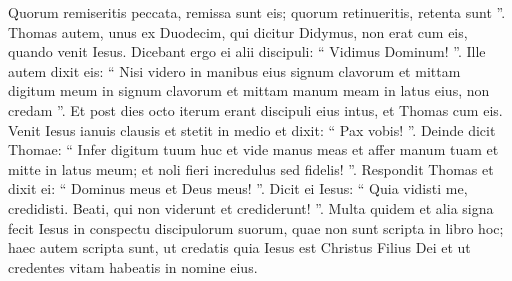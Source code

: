 \begin{biblechapter}
\begin{biblechapter}
\begin{biblechapter}
\begin{biblechapter}
\begin{biblechapter}
\begin{biblechapter}
\begin{biblechapter}
\begin{biblechapter}
\begin{biblechapter}
\begin{biblechapter}
\begin{biblechapter}
\begin{biblechapter}
\begin{biblechapter}
\begin{biblechapter}
\begin{biblechapter}
\begin{biblechapter}
\begin{biblechapter}
\begin{biblechapter}
\begin{biblechapter}
\begin{biblechapter}
\verse Quorum remiseritis peccata, remissa sunt eis; quorum retinueritis, retenta sunt ”.
 \verse Thomas autem, unus ex Duodecim, qui dicitur Didymus, non erat cum eis, quando venit Iesus. 
\verse Dicebant ergo ei alii discipuli: “ Vidimus Dominum! ”. Ille autem dixit eis: “ Nisi videro in manibus eius signum clavorum et mittam digitum meum in signum clavorum et mittam manum meam in latus eius, non credam ”.
 \verse Et post dies octo iterum erant discipuli eius intus, et Thomas cum eis. Venit Iesus ianuis clausis et stetit in medio et dixit: “ Pax vobis! ”. 
\verse Deinde dicit Thomae: “ Infer digitum tuum huc et vide manus meas et affer manum tuam et mitte in latus meum; et noli fieri incredulus sed fidelis! ”. 
\verse Respondit Thomas et dixit ei: “ Dominus meus et Deus meus! ”. 
\verse Dicit ei Iesus: “ Quia vidisti me, credidisti. Beati, qui non viderunt et crediderunt! ”.
 \verse Multa quidem et alia signa fecit Iesus in conspectu discipulorum suorum, quae non sunt scripta in libro hoc; 
\verse haec autem scripta sunt, ut credatis quia Iesus est Christus Filius Dei et ut credentes vitam habeatis in nomine eius.
 

\end{biblechapter}
\end{biblechapter}
\end{biblechapter}
\end{biblechapter}
\end{biblechapter}
\end{biblechapter}
\end{biblechapter}
\end{biblechapter}
\end{biblechapter}
\end{biblechapter}
\end{biblechapter}
\end{biblechapter}
\end{biblechapter}
\end{biblechapter}
\end{biblechapter}
\end{biblechapter}
\end{biblechapter}
\end{biblechapter}
\end{biblechapter}
\end{biblechapter}
